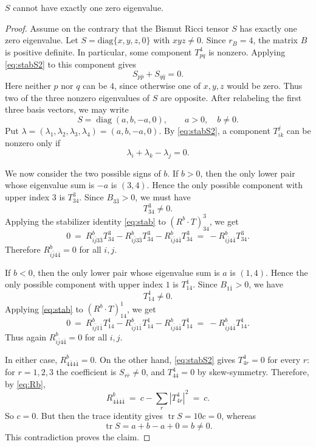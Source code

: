 \documentclass{amsart}
\begin{document}
 $S$ cannot have exactly one zero eigenvalue.
\begin{proof}
Assume on the contrary that the Bismut Ricci tensor $S$ has exactly one zero eigenvalue. Let $S=\mbox{diag}\{ x,y,z,0\}$ with $xyz\neq 0$.  Since \(r_B=4\), the matrix \(B\) is positive definite.  In particular, some component \(T^4_{pq}\) is nonzero.  Applying \eqref{eq:stabS2} to this component gives
$$
S_{p\bar p}+S_{q\bar q}=0.
$$
Here neither \(p\) nor \(q\) can be \(4\), since otherwise one of \(x,y,z\) would be zero.  Thus two of the three nonzero eigenvalues of \(S\) are opposite.  After relabeling the first three basis vectors, we may write
$$
S=\operatorname{diag}(a,b,-a,0),\qquad a>0,\quad b\neq0.
$$
Put \(\lambda=(\lambda_1,\lambda_2,\lambda_3,\lambda_4)=(a,b,-a,0)\).  By \eqref{eq:stabS2}, a component \(T^j_{ik}\) can be nonzero only if
$$
\lambda_i+\lambda_k-\lambda_j=0.
$$

We now consider the two possible signs of \(b\).  If \(b>0\), then the only lower pair whose eigenvalue sum is \(-a\) is \((3,4)\).  Hence the only possible component with upper index \(3\) is \(T^3_{34}\).  Since \(B_{3\bar3}>0\), we must have
$$
T^3_{34}\neq0.
$$
Applying the stabilizer identity \eqref{eq:stab} to \((R^b\cdot T)^3_{34}\), we get
$$
0 \ =\ R^b_{i\bar j3\bar3}T^3_{34}
-R^b_{i\bar j3\bar3}T^3_{34}
-R^b_{i\bar j4\bar4}T^3_{34} \ = \ -R^b_{i\bar j4\bar4}T^3_{34}.
$$
Therefore \(R^b_{i\bar j4\bar4}=0\) for all \(i,j\).

If \(b<0\), then the only lower pair whose eigenvalue sum is \(a\) is \((1,4)\).  Hence the only possible component with upper index \(1\) is \(T^1_{14}\).  Since \(B_{1\bar1}>0\), we have
$$
T^1_{14}\neq0.
$$
Applying \eqref{eq:stab} to \((R^b\cdot T)^1_{14}\), we get
$$
0 \ = \ R^b_{i\bar j1\bar1}T^1_{14}
-R^b_{i\bar j1\bar1}T^1_{14}
-R^b_{i\bar j4\bar4}T^1_{14}\ = \ -R^b_{i\bar j4\bar4}T^1_{14}.
$$
Thus again \(R^b_{i\bar j4\bar4}=0\) for all \(i,j\).

In either case, \(R^b_{4\bar44\bar4}=0\).  On the other hand, \eqref{eq:stabS2} gives \(T^4_{4r}=0\) for every \(r\): for \(r=1,2,3\) the coefficient is \(S_{r\bar r}\neq0\), and \(T^4_{44}=0\) by skew-symmetry.  Therefore, by \eqref{eq:Rb},
$$
R^b_{4\bar44\bar4} \ = \ c-\sum_r|T^4_{4r}|^2 \ = \ c.
$$
So \(c=0\).  But then the trace identity gives \(\operatorname{tr}S=10c=0\), whereas
$$
\operatorname{tr}S=a+b-a+0=b\neq0.
$$
This contradiction proves the claim.
\end{proof}
\end{document}
